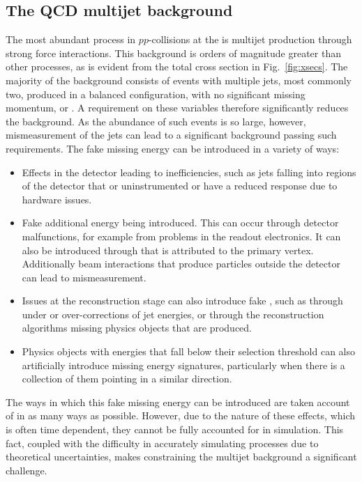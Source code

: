 \subsection{The QCD multijet background}

The most abundant \SM process in $pp$-collisions at the \LHC is \QCD
multijet production through strong force interactions. This background
is orders of magnitude greater than other processes, as is evident
from the total \LHC cross section in Fig.~\ref{fig:xsecs}. The
majority of the \QCD background consists of events with multiple jets,
most commonly two, produced in a balanced configuration, with no
significant missing momentum, \MET or \MHT. A requirement on these
variables therefore significantly reduces the background. As
the abundance of such events is so large, however, mismeasurement of
the jets can lead to a significant \QCD background passing such
requirements. The fake missing energy can be introduced in a variety
of ways:
\begin{itemize}
\item{Effects in the detector leading to inefficiencies, such as jets
falling into regions of the detector that or uninstrumented or have a
reduced response due to hardware issues.}
\item{Fake additional energy being introduced. This can occur through
detector malfunctions, for example from problems in the readout
electronics. It can also be introduced through \PU that is attributed to
the primary vertex. Additionally beam interactions that produce
particles outside the detector can lead to mismeasurement.}
\item{Issues at the reconstruction stage can also introduce fake \MET,
such as through under or over-corrections of jet energies, or through
the reconstruction algorithms missing physics objects that are
produced.}
\item{Physics objects with energies that fall below their selection
threshold can also artificially introduce missing energy signatures,
particularly when there is a collection of them pointing in a similar
direction.}
\end{itemize}

The ways in which this fake missing energy can be introduced are
taken account of in as many ways as possible. However, due to the
nature of these effects, which is often time dependent, they cannot be
fully accounted for in simulation. This fact, coupled with the
difficulty in accurately simulating \QCD processes due to theoretical
uncertainties, makes constraining the multijet background a significant
challenge. 

